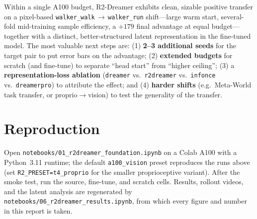 \documentclass[11pt]{article}
\begin{document}
Within a single A100 budget, R2-Dreamer exhibits clean, sizable positive
transfer on a pixel-based \texttt{walker\_walk}\,$\rightarrow$\,\texttt{walker\_run}
shift---large warm start, several-fold mid-training sample efficiency, a $+179$
final advantage at equal budget---together with a distinct, better-structured
latent representation in the fine-tuned model. The most valuable next steps are:
(1) \textbf{2--3 additional seeds} for the target pair to put error bars on the
advantage; (2) \textbf{extended budgets} for scratch (and fine-tune) to separate
``head start'' from ``higher ceiling''; (3) a \textbf{representation-loss
ablation} (\texttt{dreamer} vs.\ \texttt{r2dreamer} vs.\ \texttt{infonce} vs.\
\texttt{dreamerpro}) to attribute the effect; and (4) \textbf{harder shifts}
(e.g.\ Meta-World task transfer, or proprio$\rightarrow$vision) to test the
generality of the transfer.

\section*{Reproduction}

Open \texttt{notebooks/01\_r2dreamer\_foundation.ipynb} on a Colab A100 with a
Python~3.11 runtime; the default \texttt{a100\_vision} preset reproduces the runs
above (set \texttt{R2\_PRESET=t4\_proprio} for the smaller proprioceptive
variant). After the smoke test, run the source, fine-tune, and scratch cells.
Results, rollout videos, and the latent analysis are regenerated by
\texttt{notebooks/06\_r2dreamer\_results.ipynb}, from which every figure and
number in this report is taken.
\end{document}
